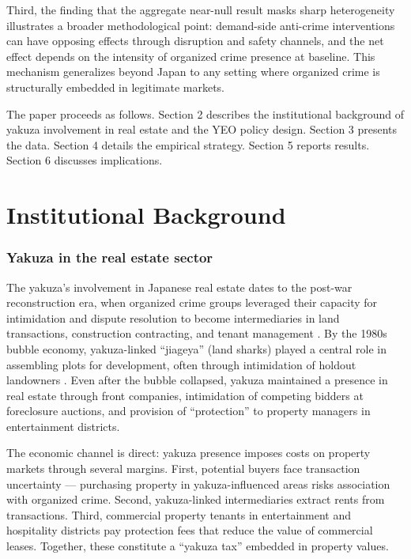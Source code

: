 \documentclass[12pt]{article}
\begin{document}
Third, the finding that the aggregate near-null result masks sharp heterogeneity illustrates a broader methodological point: demand-side anti-crime interventions can have opposing effects through disruption and safety channels, and the net effect depends on the intensity of organized crime presence at baseline. This mechanism generalizes beyond Japan to any setting where organized crime is structurally embedded in legitimate markets.

The paper proceeds as follows. Section 2 describes the institutional background of yakuza involvement in real estate and the YEO policy design. Section 3 presents the data. Section 4 details the empirical strategy. Section 5 reports results. Section 6 discusses implications.

\section{Institutional Background}

\subsubsection*{Yakuza in the real estate sector} The yakuza's involvement in Japanese real estate dates to the post-war reconstruction era, when organized crime groups leveraged their capacity for intimidation and dispute resolution to become intermediaries in land transactions, construction contracting, and tenant management \citep{hill2003yakuza, kaplan2012yakuza}. By the 1980s bubble economy, yakuza-linked ``jiageya'' (land sharks) played a central role in assembling plots for development, often through intimidation of holdout landowners \citep{milhaupt2001creative}. Even after the bubble collapsed, yakuza maintained a presence in real estate through front companies, intimidation of competing bidders at foreclosure auctions, and provision of ``protection'' to property managers in entertainment districts.

The economic channel is direct: yakuza presence imposes costs on property markets through several margins. First, potential buyers face transaction uncertainty --- purchasing property in yakuza-influenced areas risks association with organized crime. Second, yakuza-linked intermediaries extract rents from transactions. Third, commercial property tenants in entertainment and hospitality districts pay protection fees that reduce the value of commercial leases. Together, these constitute a ``yakuza tax'' embedded in property values.
\end{document}
